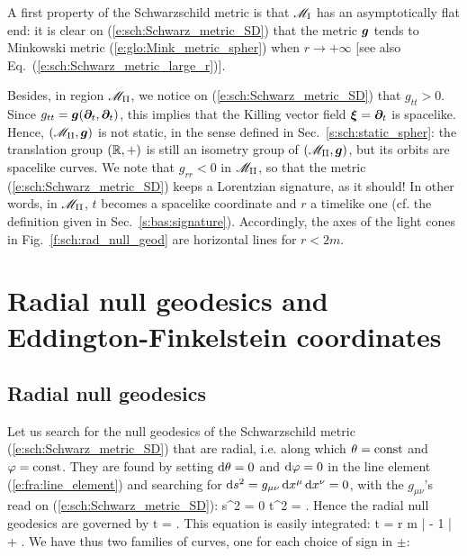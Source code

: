 A first property of the Schwarzschild metric is that $\mathscr{M}_{\rm I}$ has an
asymptotically flat end: it is clear on (\ref{e:sch:Schwarz_metric_SD})
that the metric $\bm{g}$ tends to Minkowski metric (\ref{e:glo:Mink_metric_spher})
when $r\rightarrow +\infty$ [see also Eq.~(\ref{e:sch:Schwarz_metric_large_r})].

Besides, in region $\mathscr{M}_{\rm II}$, we notice on (\ref{e:sch:Schwarz_metric_SD})
that $g_{tt} > 0$. Since $g_{tt} = \bm{g}(\bm{\partial}_t,\bm{\partial}_t)$, this implies
that the Killing vector field $\bm{\xi} = \bm{\partial}_t$ is spacelike. Hence,
$(\mathscr{M}_{\rm II},\bm{g})$ is not static, in the sense defined in
Sec.~\ref{s:sch:static_spher}: the translation group $(\mathbb{R},+)$ is still an
isometry group of $(\mathscr{M}_{\rm II},\bm{g})$, but its orbits are spacelike curves.
We note that $g_{rr} < 0$ in $\mathscr{M}_{\rm II}$, so that the
metric (\ref{e:sch:Schwarz_metric_SD}) keeps a Lorentzian signature,
as it should!
In other words, in $\mathscr{M}_{\rm II}$, $t$ becomes a spacelike coordinate and
$r$ a timelike one (cf. the definition given in Sec.~\ref{s:bas:signature}).
Accordingly, the axes of the light cones
in Fig.~\ref{f:sch:rad_null_geod} are horizontal lines for $r<2m$.


\section{Radial null geodesics and Eddington-Finkelstein coordinates}
\label{s:sch:rad_geod_EF}

\subsection{Radial null geodesics}
\label{s:sch:rad_null_geod}

Let us search for the null geodesics of the Schwarzschild metric
(\ref{e:sch:Schwarz_metric_SD}) that are radial, i.e. along which
$\theta=\mathrm{const}$ and $\varphi=\mathrm{const}$. They are found by
setting  $\mathrm{d}\theta=0$ and $\mathrm{d}\varphi=0$ in the line element (\ref{e:fra:line_element})
and searching for $\mathrm{d} s^2 = g_{\mu\nu}\, \mathrm{d} x^\mu \, \mathrm{d} x^\nu = 0$,
with the $g_{\mu\nu}$'s read on (\ref{e:sch:Schwarz_metric_SD}):
\be \label{e:sch:radial_null}
    \D s^2 = 0 \iff \D t^2 =  .
\ee
Hence the radial null geodesics are governed by
\be \label{e:sch:Dt_Dr_radial_null_geod}
    \D t = \pm {} .
\ee
This equation is easily integrated:
\be \label{e:sch:t_r_radial_null_geod}
    t = \pm r  m \ln \left|  - 1 \right| +  .
\ee
We have thus two families of curves, one for each choice
of sign in $\pm$:

